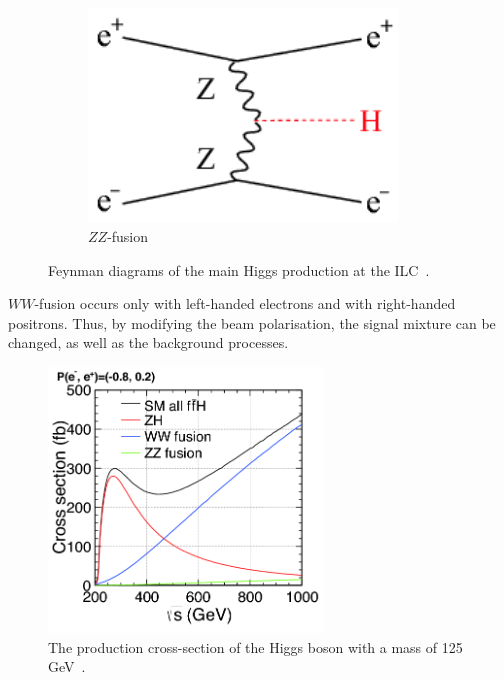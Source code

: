 \begin{figure}[!tbh]
\begin{subfigure}[t]{0.3\textwidth}
            \includegraphics[width = 0.9\textwidth]{Pictures/Higgs/HiggsProd_eeH.png}
            \caption{$ZZ$-fusion}
            \label{fig:ZZ-fusion}
        \end{subfigure}
        \caption{Feynman diagrams of the main Higgs production at the ILC~\cite{Asner2013}\cite{tian}.}
        \label{fig:higgsProduction}
    \end{figure}    
    
    $WW$-fusion occurs only with left-handed electrons and with right-handed positrons.
    Thus, by modifying the beam polarisation, the signal mixture can be changed, as well as the background processes.

    \begin{figure}[!tbh]
      \centering
      \includegraphics[width = 0.65\textwidth]{Pictures/Higgs/higgs_xsec_P-8_3.png}
      \caption{The production cross-section of the Higgs boson with a mass of 125 GeV~\cite{Asner2013}.}
      \label{fig:higgsXsec}
    \end{figure}

